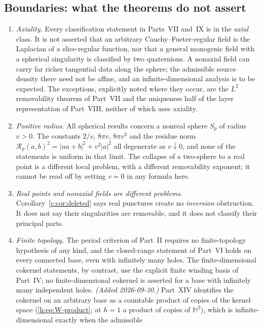 \documentclass[11pt,a4paper]{article}
\numberwithin{equation}{section}
\theoremstyle{definition}
\theoremstyle{remark}
\theoremstyle{plain}
\newcommand{\HH}{\mathbb H}
\newcommand{\Sp}{S_{p}}
\newcommand{\Rp}{\mathcal R_{p}}      %
\newcommand{\abs}[1]{\lvert #1\rvert}
\begin{document}
\subsection{Boundaries: what the theorems do not assert}
\label{f:sub:boundaries}

\begin{enumerate}[label=\textup{(B\arabic*)}]
\item \emph{Axiality.} Every classification statement in Parts~VII and~IX
is in the \emph{axial} class. It is not asserted that an arbitrary
Cauchy--Fueter-regular field is the Laplacian of a slice-regular function,
nor that a general monogenic field with a spherical singularity is
classified by two quaternions. A nonaxial field can carry far richer
tangential data along the sphere; the admissible source density there need
not be affine, and an infinite-dimensional analysis is to be expected. The
exceptions, explicitly noted where they occur, are the $L^2$ removability
theorem of Part~VII and the uniqueness half of the layer representation of
Part~VIII, neither of which uses axiality.
\item \emph{Positive radius.} All spherical results concern a nonreal
sphere $\Sp$ of radius $v>0$. The constants $2/v$, $8\pi v$, $8\pi v^3$ and
the residue norm $\Rp(a,b)^2=\abs{ua+b}^2+v^2\abs a^2$ all degenerate as
$v\downarrow0$, and none of the statements is uniform in that limit. The
collapse of a two-sphere to a real point is a different local problem, with
a different removability exponent; it cannot be read off by setting $v=0$
in any formula here.
\item \emph{Real points and nonaxial fields are different problems.}
Corollary~\ref{c:cor:deleted} says real punctures create no
\emph{inversion} obstruction. It does not say their singularities are
removable, and it does not classify their principal parts.
\item \emph{Finite topology.} The period criterion of Part~II requires no
finite-topology hypothesis of any kind, and the closed-range statement of
Part~VI holds on every connected base, even with infinitely many holes.
The finite-dimensional cokernel statements, by contrast, use the explicit
finite winding basis of Part~IV; no finite-dimensional cokernel is asserted
for a base with infinitely many independent holes. \emph{(Added 2026-09-30.)}
Part~XIV identifies the cokernel on an arbitrary base as a countable product
of copies of the kernel space (\eqref{h:eq:W-product}; at $h=1$ a product of
copies of $\HH^2$), which is infinite-dimensional exactly when the admissible

\end{enumerate}
\end{document}
